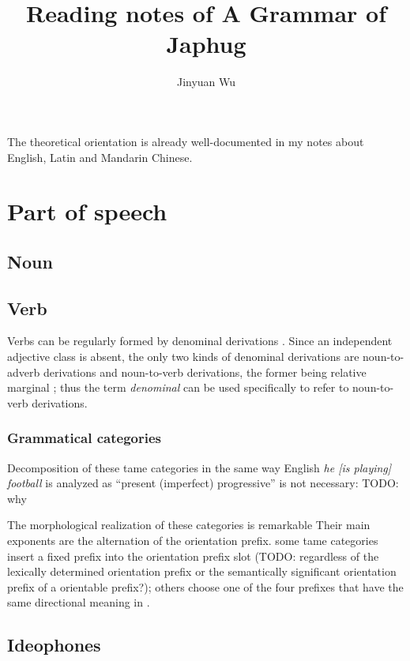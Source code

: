 \documentclass[a4paper, oneside, 12pt]{report}
\title{Reading notes of A Grammar of Japhug}
\author{Jinyuan Wu}
\newcommand*{\citechap}[1]{Ch~{#1}}
\newcommand*{\citetable}[1]{Table~{#1}}
\newcommand*{\citepage}[1]{p.~{#1}}
\newcommand*{\term}[1]{\emph{#1}}
\newcommand{\form}[1]{\emph{#1}}
\begin{document}
\maketitle

The theoretical orientation is already well-documented in my notes about English, Latin and Mandarin Chinese.

\chapter{Part of speech}

\section{Noun}

\section{Verb}

Verbs can be regularly formed by denominal derivations
\citep[\citechap{20}]{jacques2021grammar}.
Since an independent adjective class is absent, 
the only two kinds of denominal derivations 
are noun-to-adverb derivations and noun-to-verb derivations,
the former being relative marginal \citep[\citepage{1011}]{jacques2021grammar};
thus the term \term{denominal} can be used specifically 
to refer to noun-to-verb derivations.

\subsection{Grammatical categories}


Decomposition of these \acs{tame} categories 
in the same way English \form{he [is playing] football} 
is analyzed as ``present (imperfect) progressive'' is not necessary:
TODO: why

The morphological realization of these categories is remarkable
Their main exponents are the alternation of the orientation prefix.
some \acs{tame} categories insert a fixed prefix 
into the orientation prefix slot (TODO: regardless of the lexically determined orientation prefix 
or the semantically significant orientation prefix of a orientable prefix?);
others choose one of the four prefixes that have the same directional meaning 
in \citet[\citetable{15.1}]{jacques2021grammar}. 


\section{Ideophones}
\end{document}
